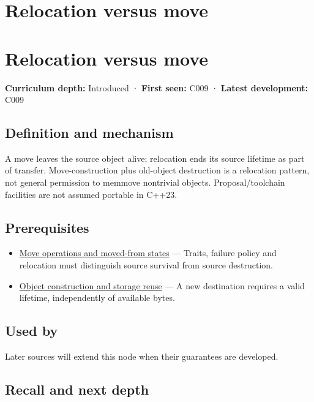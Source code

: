 \hypertarget{appendix-adfd6397af8d}{}
\section*{Relocation versus move}
\section{Relocation versus move}\label{appendix-adfd6397af8d-relocation-versus-move}

\textbf{Curriculum depth:} Introduced · \textbf{First seen:} C009 · \textbf{Latest development:} C009

\subsection{Definition and mechanism}\label{appendix-adfd6397af8d-definition-and-mechanism}

A move leaves the source object alive; relocation ends its source lifetime as part of transfer. Move-construction plus old-object destruction is a relocation pattern, not general permission to memmove nontrivial objects. Proposal/toolchain facilities are not assumed portable in C++23.

\subsection{Prerequisites}\label{appendix-adfd6397af8d-prerequisites}

\begin{itemize}
\tightlist
\item
  \hyperref[appendix-5636651017c2]{Move operations and moved-from states} --- Traits, failure policy and relocation must distinguish source survival from source destruction.
\item
  \hyperref[appendix-a82f9c438857]{Object construction and storage reuse} --- A new destination requires a valid lifetime, independently of available bytes.
\end{itemize}

\subsection{Used by}\label{appendix-adfd6397af8d-used-by}

Later sources will extend this node when their guarantees are developed.

\subsection{Recall and next depth}\label{appendix-adfd6397af8d-recall-and-next-depth}

